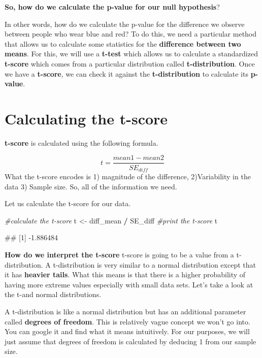 \documentclass[
]{book}
\newenvironment{Shaded}{\begin{snugshade}}{\end{snugshade}}
\newcommand{\CommentTok}[1]{\textcolor[rgb]{0.56,0.35,0.01}{\textit{#1}}}
\newcommand{\NormalTok}[1]{#1}
\newcommand{\OtherTok}[1]{\textcolor[rgb]{0.56,0.35,0.01}{#1}}
\newcommand{\SpecialCharTok}[1]{\textcolor[rgb]{0.81,0.36,0.00}{\textbf{#1}}}
\begin{document}
\textbf{So, how do we calculate the p-value for our null hypothesis}?

In other words, how do we calculate the p-value for the difference we observe between people who wear blue and red? To do this, we need a particular method that allows us to calculate some statistics for the \textbf{difference between two means}. For this, we will use a \textbf{t-test} which allows us to calculate a standardized \textbf{t-score} which comes from a particular distribution called \textbf{t-distribution}. Once we have a \textbf{t-score}, we can check it against the \textbf{t-distribution} to calculate its \textbf{p-value}.

\hypertarget{calculating-the-t-score}{%
\section{Calculating the t-score}\label{calculating-the-t-score}}

\textbf{t-score} is calculated using the following formula.

\[t = \frac{mean1-mean2}{SE_{diff}}\]
What the t-score encodes is 1) magnitude of the difference, 2)Variability in the data 3) Sample size. So, all of the information we need.

Let us calculate the t-score for our data.

\begin{Shaded}
\begin{Highlighting}[]
\CommentTok{\#calculate the t{-}score}
\NormalTok{t }\OtherTok{\textless{}{-}}\NormalTok{ diff\_mean }\SpecialCharTok{/}\NormalTok{ SE\_diff}
\CommentTok{\#print the t{-}score}
\NormalTok{t}
\end{Highlighting}
\end{Shaded}

\begin{Shaded}
\begin{Highlighting}[]
\NormalTok{\#\# [1] {-}1.886484}
\end{Highlighting}
\end{Shaded}

\textbf{How do we interpret the t-score}
t-score is going to be a value from a t-distribution. A t-distribution is very similar to a normal distribution except that it has \textbf{heavier tails}. What this means is that there is a higher probability of having more extreme values especially with small data sets. Let's take a look at the t-and normal distributions.

A t-distribution is like a normal distribution but has an additional parameter called \textbf{degrees of freedom}. This is relatively vague concept we won't go into. You can google it and find what it means intuitively. For our purposes, we will just assume that degrees of freedom is calculated by deducing 1 from our sample size.
\end{document}
